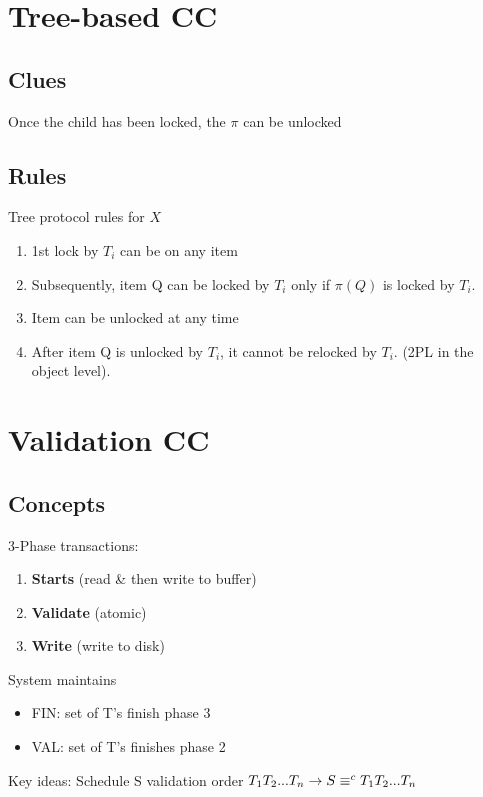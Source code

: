 \documentclass[a4paper]{report}
\begin{document}
\section{Tree-based CC}
\subsection{Clues}
Once the child has been locked, the $\pi$ can be unlocked
\subsection{Rules}
Tree protocol rules for $X$
\begin{enumerate}
\item 1st lock by $T_i$ can be on any item
\item Subsequently, item Q can be locked by $T_i$ only if $\pi(Q)$ is locked by $T_i$.
\item Item can be unlocked at any time
\item After item Q is unlocked by $T_i$, it cannot be relocked by $T_i$. (2PL in the object level).
\end{enumerate}
\section{Validation CC}
\subsection{Concepts}
3-Phase transactions:
\begin{enumerate}
\item \textbf{Starts} (read \& then write to buffer)
\item \textbf{Validate} (atomic)
\item \textbf{Write} (write to disk)
\end{enumerate}
System maintains
\begin{itemize}
\item FIN: set of T's finish phase 3
\item VAL: set of T's finishes phase 2
\end{itemize}
Key ideas:
Schedule S validation order $T_1T_2...T_n \rightarrow S\equiv^c T_1T_2...T_n$
\end{document}
